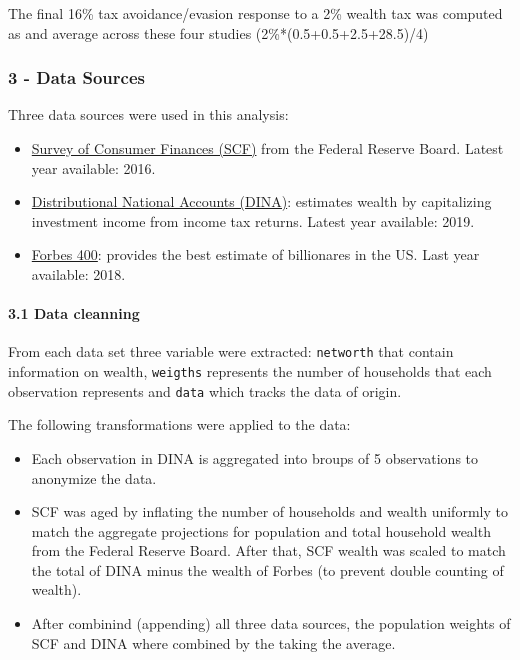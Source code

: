 \documentclass[]{article}
\providecommand{\tightlist}{%
  \setlength{\itemsep}{0pt}\setlength{\parskip}{0pt}}
\let\oldparagraph\paragraph
\renewcommand{\paragraph}[1]{\oldparagraph{#1}\mbox{}}
\begin{document}
The final 16\% tax avoidance/evasion response to a 2\% wealth tax was
computed as and average across these four studies
(2\%*(0.5+0.5+2.5+28.5)/4)

\hypertarget{data-sources}{%
\subsubsection{3 - Data Sources}\label{data-sources}}

Three data sources were used in this analysis:

\begin{itemize}
\tightlist
\item
  \href{https://www.federalreserve.gov/econres/scfindex.htm}{Survey of
  Consumer Finances (SCF)} from the Federal Reserve Board. Latest year
  available: 2016.\\
\item
  \href{http://gabriel-zucman.eu/usdina/}{Distributional National
  Accounts (DINA)}: estimates wealth by capitalizing investment income
  from income tax returns. Latest year available: 2019.\\
\item
  \href{https://www.forbes.com/forbes-400/\#4d358acf7e2f}{Forbes 400}:
  provides the best estimate of billionares in the US. Last year
  available: 2018.
\end{itemize}

\hypertarget{data-cleanning}{%
\paragraph{3.1 Data cleanning}\label{data-cleanning}}

From each data set three variable were extracted: \texttt{networth} that
contain information on wealth, \texttt{weigths} represents the number of
households that each observation represents and \texttt{data} which
tracks the data of origin.

The following transformations were applied to the data:

\begin{itemize}
\tightlist
\item
  Each observation in DINA is aggregated into broups of 5 observations
  to anonymize the data.\\
\item
  SCF was aged by inflating the number of households and wealth
  uniformly to match the aggregate projections for population and total
  household wealth from the Federal Reserve Board. After that, SCF
  wealth was scaled to match the total of DINA minus the wealth of
  Forbes (to prevent double counting of wealth).\\
\item
  After combinind (appending) all three data sources, the population
  weights of SCF and DINA where combined by the taking the average.
\end{itemize}
\end{document}
